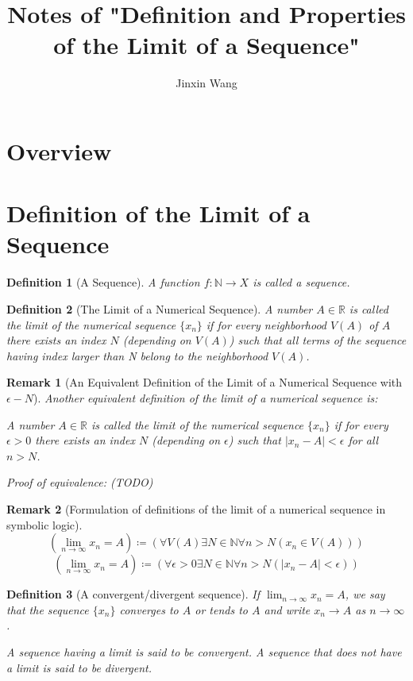 \documentclass[onecolumn]{ctexart}
\title{Notes of "Definition and Properties of the Limit of a Sequence"}
\author{Jinxin Wang}
\date{}
\newtheorem{definition}{Definition}
\newtheorem{remark}{Remark}
\begin{document}
\maketitle

\section{Overview}

\section{Definition of the Limit of a Sequence}

\begin{definition}[A Sequence]
  A function $f: \mathbb{N} \to X$ is called a sequence.
\end{definition}

\begin{definition}[The Limit of a Numerical Sequence]
  A number $A \in \mathbb{R}$ is called the limit of the numerical sequence 
  $\lbrace x_n \rbrace$ if for every neighborhood $V(A)$ of $A$ there exists an 
  index $N$ (depending on $V(A)$) such that all terms of the sequence having 
  index larger than N belong to the neighborhood $V(A)$.
\end{definition}
\begin{remark}[An Equivalent Definition of the Limit of a Numerical Sequence with $\epsilon-N$]
  Another equivalent definition of the limit of a numerical sequence is:

  A number $A \in \mathbb{R}$ is called the limit of the numerical sequence 
  $\lbrace x_n \rbrace$ if for every $\epsilon > 0$ there exists an index $N$ 
  (depending on $\epsilon$) such that $|x_n - A| < \epsilon$ for all $n > N$.

  Proof of equivalence: (TODO)
\end{remark}
\begin{remark}[Formulation of definitions of the limit of a numerical sequence in symbolic logic]
  \[
    (\lim_{n \to \infty} x_n = A) \coloneqq (\forall V(A) \exists N \in \mathbb{N} \forall n > N (x_n \in V(A)))
  \]
  \[
    (\lim_{n \to \infty} x_n = A) \coloneqq (\forall \epsilon > 0 \exists N \in \mathbb{N} \forall n > N (|x_n - A| < \epsilon))
  \]
\end{remark}

\begin{definition}[A convergent/divergent sequence]
  If $\lim_{n \to \infty} x_n = A$, we say that the sequence $\lbrace x_n 
  \rbrace$ converges to $A$ or tends to $A$ and write $x_n \to A$ as $n \to 
  \infty$.

  A sequence having a limit is said to be convergent. A sequence that does not 
  have a limit is said to be divergent.
\end{definition}
\end{document}

